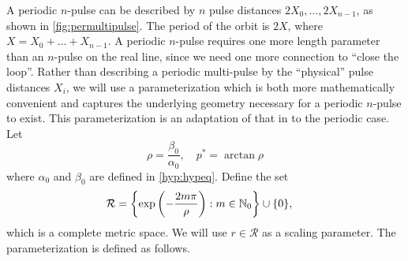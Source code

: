 \documentclass[12pt]{elsarticle}
\theoremstyle{plain}
\theoremstyle{definition}
\theoremstyle{remark}
\numberwithin{theorem}{section}
\numberwithin{equation}{section}
\begin{document}
A periodic $n$-pulse can be described by $n$ pulse distances $2 X_0, \dots, 2 X_{n-1}$, as shown in \cref{fig:permultipulse}. The period of the orbit is $2X$, where $X = X_0 + \dots + X_{n-1}$. A periodic $n$-pulse requires one more length parameter than an $n$-pulse on the real line, since we need one more connection to ``close the loop''.  Rather than describing a periodic multi-pulse by the ``physical'' pulse distances $X_i$, we will use a parameterization which is both more mathematically convenient and captures the underlying geometry necessary for a periodic $n$-pulse to exist. This parameterization is an adaptation of that in \cite{SandstedeStrut,Sandstede1998} to the periodic case. Let
\begin{equation}\label{defrho}
\rho = \frac{\beta_0}{\alpha_0}, \quad p^* = \arctan \rho
\end{equation}
where $\alpha_0$ and $\beta_0$ are defined in \cref{hyp:hypeq}. Define the set
\begin{align}
\mathcal{R} &= \left\{ \mathop\mathrm{exp}\nolimits\left(-\frac{2 m \pi}{\rho}\right) : m \in \mathbb{N}_0 \right\} \cup \{ 0 \},
\end{align}
which is a complete metric space. We will use $r \in \mathcal{R}$ as a scaling parameter. The parameterization is defined as follows.
\end{document}
